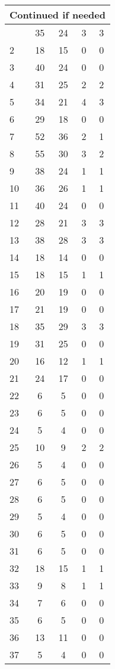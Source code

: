 \begin{center}
\begin{longtable}{l|c|c|c|c}
\hline \multicolumn{5}{|r|}{{Continued if needed}} \\ \hline
\endfoot 
1 & 35 & 24 & 3 & 3\\ \hline
2 & 18 & 15 & 0 & 0\\ \hline
3 & 40 & 24 & 0 & 0\\ \hline
4 & 31 & 25 & 2 & 2\\ \hline
5 & 34 & 21 & 4 & 3\\ \hline
6 & 29 & 18 & 0 & 0\\ \hline
7 & 52 & 36 & 2 & 1\\ \hline
8 & 55 & 30 & 3 & 2\\ \hline
9 & 38 & 24 & 1 & 1\\ \hline
10 & 36 & 26 & 1 & 1\\ \hline
11 & 40 & 24 & 0 & 0\\ \hline
12 & 28 & 21 & 3 & 3\\ \hline
13 & 38 & 28 & 3 & 3\\ \hline
14 & 18 & 14 & 0 & 0\\ \hline
15 & 18 & 15 & 1 & 1\\ \hline
16 & 20 & 19 & 0 & 0\\ \hline
17 & 21 & 19 & 0 & 0\\ \hline
18 & 35 & 29 & 3 & 3\\ \hline
19 & 31 & 25 & 0 & 0\\ \hline
20 & 16 & 12 & 1 & 1\\ \hline
21 & 24 & 17 & 0 & 0\\ \hline
22 & 6 & 5 & 0 & 0\\ \hline
23 & 6 & 5 & 0 & 0\\ \hline
24 & 5 & 4 & 0 & 0\\ \hline
25 & 10 & 9 & 2 & 2\\ \hline
26 & 5 & 4 & 0 & 0\\ \hline
27 & 6 & 5 & 0 & 0\\ \hline
28 & 6 & 5 & 0 & 0\\ \hline
29 & 5 & 4 & 0 & 0\\ \hline
30 & 6 & 5 & 0 & 0\\ \hline
31 & 6 & 5 & 0 & 0\\ \hline
32 & 18 & 15 & 1 & 1\\ \hline
33 & 9 & 8 & 1 & 1\\ \hline
34 & 7 & 6 & 0 & 0\\ \hline
35 & 6 & 5 & 0 & 0\\ \hline
36 & 13 & 11 & 0 & 0\\ \hline
37 & 5 & 4 & 0 & 0\\ \hline

\end{longtable}
\end{center}
